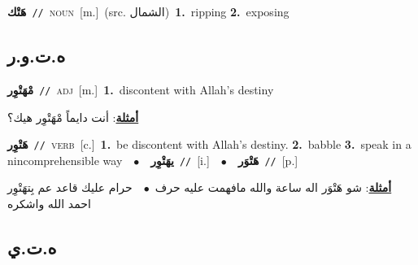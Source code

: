 \documentclass[10pt,a4paper,twoside]{article} %
\begin{document}
\begin{multicols}{2}
{{{{{{{{{{{{{\setlength\topsep{0pt}\textbf{\foreignlanguage{arabic}{هَتْك}}\ {\color{gray}\texttt{//}\color{black}}\ \textsc{noun}\ [m.]\ (src. \color{gray}\foreignlanguage{arabic}{الشمال}\color{black})\ \textbf{1.}~ripping  \textbf{2.}~exposing\ 

\vspace{-3mm}
\subsection*{\color{blue}\foreignlanguage{arabic}{ه.ت.و.ر}\color{blue}{}} 

{\setlength\topsep{0pt}\textbf{\foreignlanguage{arabic}{مْهَتْوِر}}\ {\color{gray}\texttt{//}\color{black}}\ \textsc{adj}\ [m.]\ \textbf{1.}~discontent with Allah's destiny\  \begin{flushright}\color{gray}\foreignlanguage{arabic}{\textbf{\underline{\foreignlanguage{arabic}{أمثلة}}}: أنت دايماً مْهَتْوِر هيك؟}\end{flushright}\color{black}} \vspace{2mm}

{\setlength\topsep{0pt}\textbf{\foreignlanguage{arabic}{هَتْوِر}}\ {\color{gray}\texttt{//}\color{black}}\ \textsc{verb}\ [c.]\ \textbf{1.}~be discontent with Allah's destiny.  \textbf{2.}~babble  \textbf{3.}~speak in a nincomprehensible way\ \ $\bullet$\ \ \setlength\topsep{0pt}\textbf{\foreignlanguage{arabic}{يهَتْوِر}}\ {\color{gray}\texttt{//}\color{black}}\ [i.]\ \ $\bullet$\ \ \setlength\topsep{0pt}\textbf{\foreignlanguage{arabic}{هَتْوَر}}\ {\color{gray}\texttt{//}\color{black}}\ [p.]\  \begin{flushright}\color{gray}\foreignlanguage{arabic}{\textbf{\underline{\foreignlanguage{arabic}{أمثلة}}}: شو هَتْوَر اله ساعة والله مافهمت عليه حرف\ $\bullet$\ \  حرام عليك قاعد عم بِتهَتْوِر احمد الله واشكره}\end{flushright}\color{black}} \vspace{2mm}

\vspace{-3mm}
\subsection*{\color{blue}\foreignlanguage{arabic}{ه.ت.ي}\color{blue}{}} 

}}}}}}}}}}}}}
\end{multicols}
\end{document}
